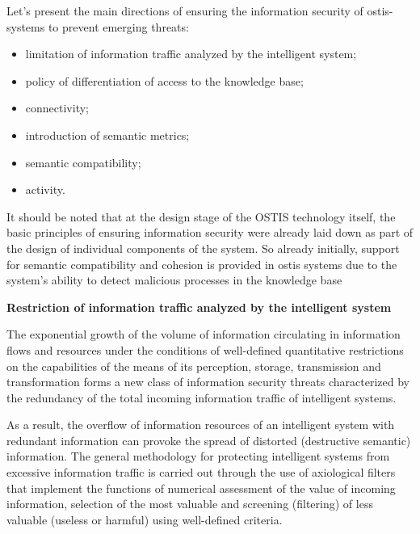 \documentclass{article}
\begin{document}
\begin{multicols}{2}
\par 
\vspace{-0.1cm} Let’s present the main directions of ensuring the
information security of ostis-systems to prevent emerging
threats:

\begin{itemize}
   \vspace{0.18cm} \item limitation of information traffic analyzed by the 
intelligent system;
    \item policy of differentiation of access to the knowledge
base;
    \item connectivity;
    \item introduction of semantic metrics;
    \item  semantic compatibility;
    \item activity.
\end{itemize}
\par
It should be noted that at the design stage of the
OSTIS technology itself, the basic principles of ensuring
information security were already laid down as part of
the design of individual components of the system. So
already initially, support for semantic compatibility and
cohesion is provided in ostis systems due to the system’s
ability to detect malicious processes in the knowledge
base
\par
\textbf{Restriction of information traffic analyzed by the
intelligent system
}
\par
The exponential growth of the volume of information
circulating in information flows and resources under the
conditions of well-defined quantitative restrictions on
the capabilities of the means of its perception, storage,
transmission and transformation forms a new class of information security threats characterized by the redundancy
of the total incoming information traffic of intelligent
systems.
\par
As a result, the overflow of information resources of
an intelligent system with redundant information can
provoke the spread of distorted (destructive semantic)
information. The general methodology for protecting
intelligent systems from excessive information traffic is
carried out through the use of axiological filters that
implement the functions of numerical assessment of the
value of incoming information, selection of the most
valuable and screening (filtering) of less valuable (useless
or harmful) using well-defined criteria.

\end{multicols}
\end{document}
